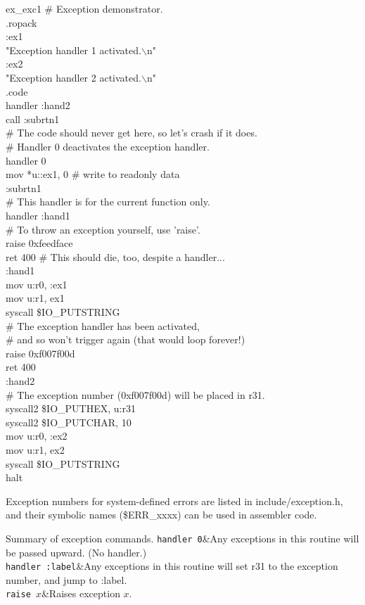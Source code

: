 \documentclass[a4paper,oneside,openany]{book}
\begin{document}
\begin{codefile}{ex\_exc1}
\# Exception demonstrator.\\
.ropack\\
:ex1\\
\>	"Exception handler 1 activated.$\backslash$n"\\
:ex2\\
\>	"Exception handler 2 activated.$\backslash$n"\\
.code\\
\>	handler :hand2\\
\>	call :subrtn1\\
\# The code should never get here, so let's crash if it does.\\
\# Handler 0 deactivates the exception handler.\\
\>	handler 0\\
\>	mov *u::ex1, 0 \# write to readonly data\\
:subrtn1\\
\# This handler is for the current function only.\\
\>	handler :hand1\\
\# To throw an exception yourself, use 'raise'.\\
\>	raise 0xfeedface\\
\>	ret 400 \# This should die, too, despite a handler...\\
:hand1\\
\>	mov u:r0, :ex1\\
\>	mov u:r1, \bsz{}ex1\\
\>	syscall \$IO\_PUTSTRING\\
\# The exception handler has been activated,\\
\# and so won't trigger again (that would loop forever!)\\
\>	raise 0xf007f00d\\
\>	ret 400\\
:hand2\\
\# The exception number (0xf007f00d) will be placed in r31.\\
\>	syscall2 \$IO\_PUTHEX, u:r31\\
\>	syscall2 \$IO\_PUTCHAR, 10\\
\>	mov u:r0, :ex2\\
\>	mov u:r1, \bsz{}ex2\\
\>	syscall \$IO\_PUTSTRING\\
\>	halt
\end{codefile}
Exception numbers for system-defined errors are listed in include/exception.h,
and their symbolic names (\$ERR\_xxxx) can be used in assembler code.
\begin{codetablefig}{Summary of exception commands.}
\texttt{handler 0}&Any exceptions in this routine will be passed upward. (No handler.)\\
\texttt{handler :label}&Any exceptions in this routine will set r31 to the
exception number, and jump to :label.\\
\texttt{raise $x$}&Raises exception $x$.\\
\end{codetablefig}
\end{document}
